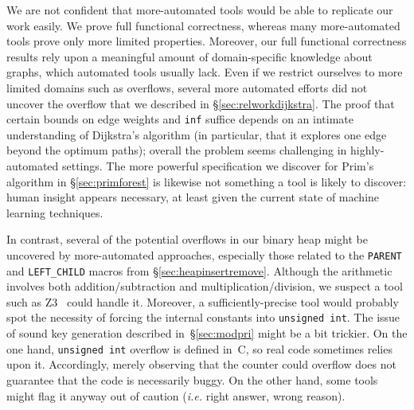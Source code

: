 We are not confident that more-automated tools would be able to replicate our work easily.  We prove full functional correctness, whereas many more-automated tools prove only more limited properties.  Moreover, our full functional correctness results rely upon a meaningful amount of domain-specific knowledge about graphs, which automated tools usually lack.  Even if we restrict ourselves to more limited domains such as overflows, several more automated efforts did not uncover the overflow that we described in \S\ref{sec:relworkdijkstra}.  The proof that certain bounds on edge weights and \texttt{inf} suffice depends on an intimate understanding of Dijkstra's algorithm (in particular, that it explores one edge beyond the optimum paths); overall the problem seems challenging in highly-automated settings.  The more powerful specification we discover for Prim's algorithm in \S\ref{sec:primforest} is likewise not something a tool is likely to discover: human insight appears necessary, at least given the current state of machine learning techniques.

In contrast, several of the potential overflows in our binary heap might be uncovered by more-automated approaches, especially those related to the \texttt{PARENT} and \texttt{LEFT\_CHILD} macros from \S\ref{sec:heapinsertremove}.  Although the arithmetic involves both addition/subtraction and multiplication/division, we suspect a tool such as Z3~\cite{moura2008} could handle it.   Moreover, a sufficiently-precise tool would probably spot the necessity of forcing the internal constants into \texttt{unsigned int}.  The issue of sound key generation described in~\S\ref{sec:modpri} might be a bit trickier.  On the one hand, \texttt{unsigned int} overflow is defined in~C, so real code sometimes relies upon it.  Accordingly, merely observing that the counter could overflow does not guarantee that the code is necessarily buggy.  On the other hand, some tools might flag it anyway out of caution (\emph{i.e.} right answer, wrong reason).

